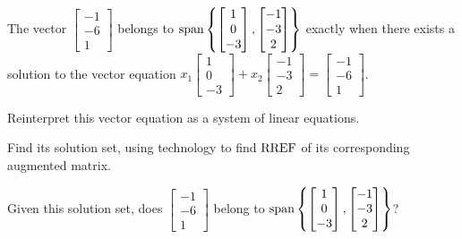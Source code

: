 \begin{activity}{15}
  The vector
  \(\begin{bmatrix}-1\\-6\\1\end{bmatrix}\) belongs to
  \(\operatorname{span}\left\{\begin{bmatrix}1\\0\\-3\end{bmatrix},
  \begin{bmatrix}-1\\-3\\2\end{bmatrix}\right\}\) exactly when
  there exists a solution to the vector equation
  \(x_1\begin{bmatrix}1\\0\\-3\end{bmatrix}+
  x_2\begin{bmatrix}-1\\-3\\2\end{bmatrix}
  =\begin{bmatrix}-1\\-6\\1\end{bmatrix}\).

  \begin{subactivity}
    Reinterpret this vector equation as a system of linear equations.
  \end{subactivity}

  \begin{subactivity}
    Find its solution set, using technology to find \(\operatorname{RREF}\) of its
    corresponding augmented matrix.
  \end{subactivity}

  \begin{subactivity}
    Given this solution set, does
    \(\begin{bmatrix}-1\\-6\\1\end{bmatrix}\) belong to
    \(\operatorname{span}\left\{\begin{bmatrix}1\\0\\-3\end{bmatrix},
    \begin{bmatrix}-1\\-3\\2\end{bmatrix}\right\}\)?
  \end{subactivity}
\end{activity}

